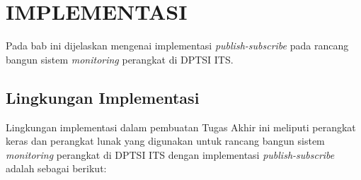 \chapter{IMPLEMENTASI}
\label{chapter:implementasi}

Pada bab ini dijelaskan mengenai implementasi \textit{publish-subscribe} pada rancang bangun sistem \textit{monitoring} perangkat di DPTSI ITS.

\section{Lingkungan Implementasi}
Lingkungan implementasi dalam pembuatan Tugas Akhir ini meliputi perangkat keras dan perangkat lunak yang digunakan untuk rancang bangun sistem \textit{monitoring} perangkat di DPTSI ITS dengan implementasi \textit{publish-subscribe} adalah sebagai berikut:


